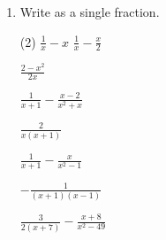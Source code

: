 \begin{enumerate} [leftmargin=0cm]
    
\item Write as a single fraction.
\begin{tasks}[label=(\alph*), after-item-skip=2pt,after-skip=3pt, label-width=4ex](2)
    \task  $ \frac{1}{x}-x                          $    
    \task  $ \frac{1}{x}-\frac{x}{2}                $    \\  \begin{envAnswer} $   \frac{2-x^2}{2x}          $ \end{envAnswer}
    \task  $ \frac{1}{x+1}-\frac{x-2}{x^2+x}        $    \\  \begin{envAnswer} $   \frac{2}{x(x+1)}          $ \end{envAnswer}
    \task  $ \frac{1}{x+1}-\frac{x}{x^2-1}          $    \\
    
             \begin{envAnswer} $ \displaystyle  -\frac{1}{(x+1)(x-1)}         $ \end{envAnswer}
    
    
    
    \task  $ \frac{3}{2(x+7)}-\frac{x+8}{x^2-49}    $   \\   



\end{tasks}
\end{enumerate}
